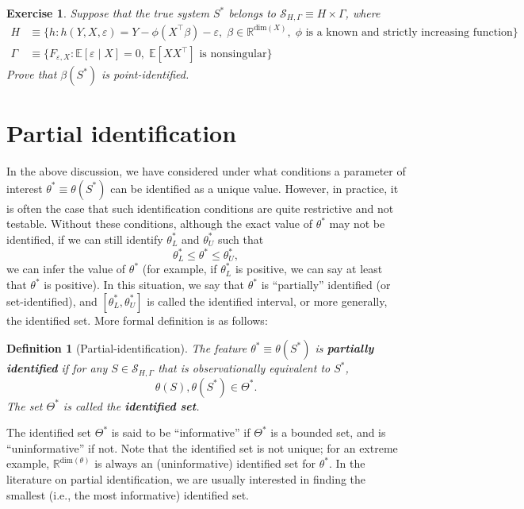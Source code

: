 \documentclass[10.5pt, A4paper, openany, uplatex]{book}
\newcommand{\mcl}{\mathcal}
\newcommand{\mbb}{\mathbb}
\newcommand{\eps}{\varepsilon}
\newcommand{\E}{\mathbb{E}}
\newtheorem{definition}[theorem]{Definition}
\newtheorem{exercise}[theorem]{Exercise}
\numberwithin{equation}{section}
\begin{document}
\begin{framed}
\begin{exercise}\upshape
Suppose that the true system $S^*$ belongs to $\mathcal{S}_{H,\Gamma} \equiv H \times \Gamma$, where
\begin{align*}
	H 
	& \equiv \{h : h(Y,X,\eps) = Y - \phi(X^\top \beta) - \eps, \; \beta \in \mathbb{R}^\text{dim$(X)$}, \; \text{$\phi$ is a known and strictly increasing function}\} \\
	\Gamma
	& \equiv \{F_{\eps, X} : \E[\eps \mid X] = 0, \; \E[XX^\top] \text{ is nonsingular}\}
\end{align*}
Prove that $\beta(S^*)$ is point-identified.
\end{exercise}
\end{framed}

\section{Partial identification}
In the above discussion, we have considered under what conditions a parameter of interest $\theta^* \equiv \theta(S^*)$ can be identified as a unique value.
However, in practice, it is often the case that such identification conditions are quite restrictive and not testable.
Without these conditions, although the exact value of $\theta^*$ may not be identified, if we can still identify $\theta^*_L$ and $\theta^*_U$ such that
\[
	\theta^*_L \le \theta^* \le \theta^*_U,
\]
we can infer the value of $\theta^*$ (for example, if $\theta^*_L$ is positive, we can say at least that $\theta^*$ is positive).
In this situation, we say that $\theta^*$ is ``partially'' identified (or set-identified), and $[\theta^*_L, \theta^*_U]$ is called the identified interval, or more generally, the identified set.
More formal definition is as follows:
\begin{definition}[Partial-identification]
	 The feature $\theta^* \equiv \theta(S^*)$ is \textbf{partially identified} if for any $S \in \mcl{S}_{H,\Gamma}$ that is observationally equivalent to $S^*$,
	\[
	\theta(S), \theta(S^*) \in \Theta^*.
	\]
	The set $\Theta^*$ is called the \textbf{identified set}.
\end{definition}
The identified set $\Theta^*$ is said to be ``informative'' if $\Theta^*$ is a bounded set, and is ``uninformative'' if not.
Note that the identified set is not unique; for an extreme example, $\mbb{R}^{\text{dim}(\theta)}$ is always an (uninformative) identified set for $\theta^*$.
In the literature on partial identification, we are usually interested in finding the smallest (i.e., the most informative) identified set.
\end{document}
